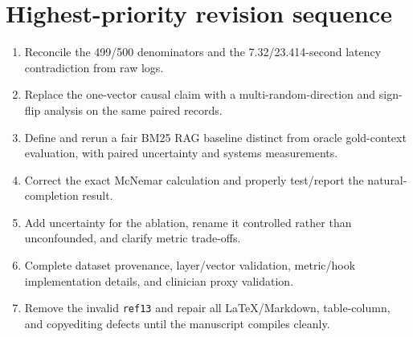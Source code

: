 \documentclass[11pt]{article}
\begin{document}
\section*{Highest-priority revision sequence}

\begin{enumerate}
    \item Reconcile the 499/500 denominators and the 7.32/23.414-second latency contradiction from raw logs.
    \item Replace the one-vector causal claim with a multi-random-direction and sign-flip analysis on the same paired records.
    \item Define and rerun a fair BM25 RAG baseline distinct from oracle gold-context evaluation, with paired uncertainty and systems measurements.
    \item Correct the exact McNemar calculation and properly test/report the natural-completion result.
    \item Add uncertainty for the ablation, rename it controlled rather than unconfounded, and clarify metric trade-offs.
    \item Complete dataset provenance, layer/vector validation, metric/hook implementation details, and clinician proxy validation.
    \item Remove the invalid \texttt{ref13} and repair all LaTeX/Markdown, table-column, and copyediting defects until the manuscript compiles cleanly.
\end{enumerate}
\end{document}

